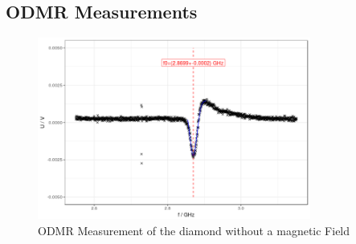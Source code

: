\subsection{ODMR Measurements}
\begin{figure}
	\centering
	\includegraphics[width=0.8\textwidth]{../figures/odmr-1.png}
	\caption{ODMR Measurement of the diamond without a magnetic Field}
	\label{fig:odmr-no-B}
\end{figure}


